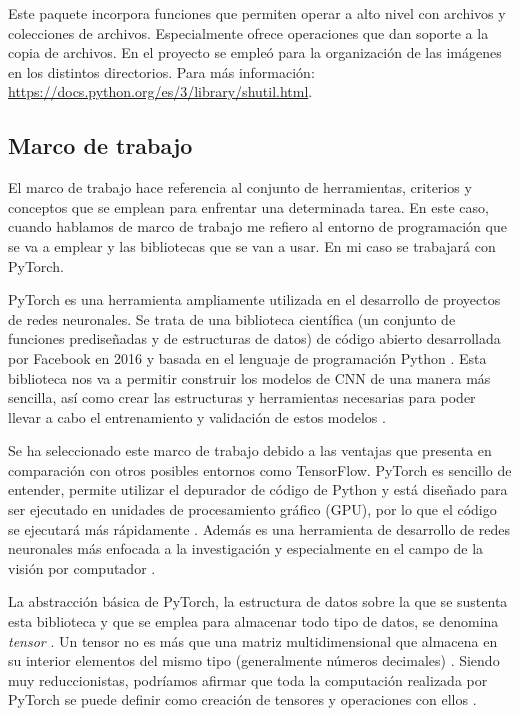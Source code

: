 Este paquete incorpora funciones que permiten operar a alto nivel con archivos y colecciones de archivos. Especialmente ofrece operaciones que dan soporte a la copia de archivos. En el proyecto se empleó para la organización de las imágenes en los distintos directorios. Para más información: \url{https://docs.python.org/es/3/library/shutil.html}.

\subsection{Marco de trabajo}

El marco de trabajo hace referencia al conjunto de herramientas, criterios y conceptos que se emplean para enfrentar una determinada tarea. En este caso, cuando hablamos de marco de trabajo me refiero al entorno de programación que se va a emplear y las bibliotecas que se van a usar. En mi caso se trabajará con PyTorch.

PyTorch es una herramienta ampliamente utilizada en el desarrollo de proyectos de redes neuronales. Se trata de una biblioteca científica (un conjunto de funciones prediseñadas y de estructuras de datos) de código abierto desarrollada por Facebook en 2016 y basada en el lenguaje de programación Python \cite{marco:pytorch_libro}. Esta biblioteca nos va a permitir construir los modelos de CNN de una manera más sencilla, así como crear las estructuras y herramientas necesarias para poder llevar a cabo el entrenamiento y validación de estos modelos \cite{marco:pytorch}.

Se ha seleccionado este marco de trabajo debido a las ventajas que presenta en comparación con otros posibles entornos como TensorFlow. PyTorch es sencillo de entender, permite utilizar el depurador de código de Python y está diseñado para ser ejecutado en unidades de procesamiento gráfico (GPU), por lo que el código se ejecutará más rápidamente \cite{marco:pytorch_libro}. Además es una herramienta de desarrollo de redes neuronales más enfocada a la investigación y especialmente en el campo de la visión por computador \cite{marco:pytorch}.

La abstracción básica de PyTorch, la estructura de datos sobre la que se sustenta esta biblioteca y que se emplea para almacenar todo tipo de datos, se denomina \textit{tensor} \cite{marco:pytorch_libro}. Un tensor no es más que una matriz multidimensional que almacena en su interior elementos del mismo tipo (generalmente números decimales) \cite{marco:pytorch_web}. Siendo muy reduccionistas, podríamos afirmar que toda la computación realizada por PyTorch se puede definir como creación de tensores y operaciones con ellos \cite{marco:pytorch_libro}.


